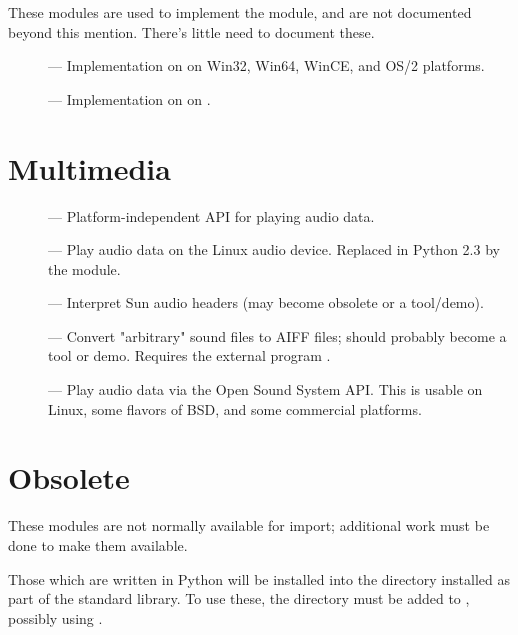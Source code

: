 These modules are used to implement the  module,
and are not documented beyond this mention.  There's little need to
document these.

\begin{description}
\item[]
--- Implementation on  on Win32, Win64, WinCE, and
OS/2 platforms.

\item[]
--- Implementation on  on \POSIX.
\end{description}


\section{Multimedia}

\begin{description}
\item[]
--- Platform-independent API for playing audio data.

\item[]
--- Play audio data on the Linux audio device.  Replaced in Python 2.3
by the  module.

\item[]
--- Interpret Sun audio headers (may become obsolete or a tool/demo).

\item[]
--- Convert "arbitrary" sound files to AIFF files; should probably
become a tool or demo.  Requires the external program .

\item[]
--- Play audio data via the Open Sound System API.  This is usable on
Linux, some flavors of BSD, and some commercial \UNIX{} platforms.
\end{description}


\section{Obsolete \label{obsolete-modules}}

These modules are not normally available for import; additional work
must be done to make them available.

Those which are written in Python will be installed into the directory 
 installed as part of the standard library.  To use
these, the directory must be added to , possibly using
.

